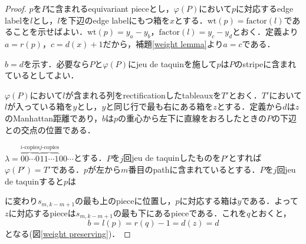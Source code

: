 \begin{proof}
  $p$を$P$に含まれるequivariant pieceとし，$\varphi(P)$において$p$に対応するedge labelを$l$とし，$l$を下辺のedge labelにもつ箱を$x$とする．$\text{wt}(p)=\text{factor}(l)$であることを示せばよい．$\text{wt}(p) = y_a-y_b$，$\text{factor}(l)=y_c-y_d$とおく．定義より$a=r(p)$，$c=d(x)+1$だから，補題\ref{weight lemma}より$a=c$である．

  $b=d$を示す．必要なら$P$と$\varphi(P)$にjeu de taquinを施して$p$は$P$のstripeに含まれているとしてよい．
  
  $\varphi(P)$において$l$が含まれる列をrectificationしたtableauxを$T'$とおく．$T'$において$l$が入っている箱を$y$とし，$y$と同じ行で最も右にある箱を$z$とする．定義から$d$は$z$のManhattan距離であり，$b$は$p$の重心から左下に直線をおろしたときの$P$の下辺との交点の位置である．
  
  $\lambda = \overbrace{00\cdots0}^{i\text{-copies}}\overbrace{11\cdots1}^{j\text{-copies}}00\cdots$とする．$P$を$j$回jeu de taquinしたものを$P'$とすれば$\varphi(P')=T'$である．$p$が左から$m$番目のpathに含まれているとする．$P$を$j$回jeu de taquinすると$p$は
  に変わり$s_{m,k-m+1}$の最も上のpieceに位置し，$p$に対応する箱は$y$である．よって$z$に対応するpieceは$s_{m,k-m+1}$の最も下にあるpieceである．これを$q$とおくと，\[
  b = l(p) = r(q) - 1 = d(z) = d
  \]
  となる(図\ref{weight preserving})．

  
\end{proof}



